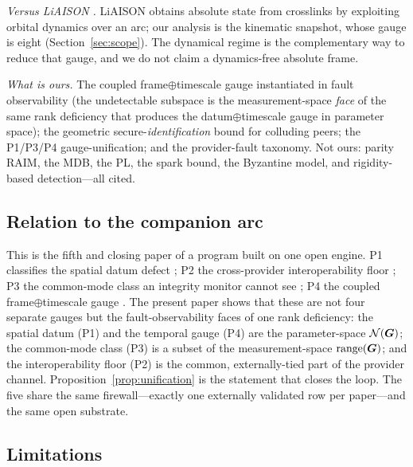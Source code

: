 \emph{Versus LiAISON \citep{hillborn2007}.} LiAISON obtains absolute state from crosslinks by
exploiting orbital dynamics over an arc; our analysis is the kinematic snapshot, whose gauge
is eight (Section~\ref{sec:scope}). The dynamical regime is the complementary way to reduce
that gauge, and we do not claim a dynamics-free absolute frame.

\emph{What is ours.} The coupled frame$\oplus$timescale gauge instantiated in fault
observability (the undetectable subspace is the measurement-space \emph{face} of the same rank
deficiency that produces the datum$\oplus$timescale gauge in parameter space); the geometric
secure-\emph{identification} bound for colluding peers;
the P1/P3/P4 gauge-unification; and the provider-fault taxonomy. Not ours: parity RAIM, the
MDB, the PL, the spark bound, the Byzantine model, and rigidity-based detection---all cited.

\subsection{Relation to the companion arc}
\label{sec:companions}

This is the fifth and closing paper of a program built on one open engine. P1 classifies the
spatial datum defect \citep{baweja2026datum}; P2 the cross-provider interoperability floor
\citep{baweja2026interop}; P3 the common-mode class an integrity monitor cannot see
\citep{baweja2026commonmode}; P4 the coupled frame$\oplus$timescale gauge
\citep{baweja2026gauge}. The present paper shows that these are not four separate gauges but
the fault-observability faces of one rank deficiency: the spatial datum (P1) and the temporal
gauge (P4) are the parameter-space $\mathcal{N}(\bm{G})$; the common-mode class (P3) is a subset of
the measurement-space $\operatorname{range}(\bm{G})$; and the interoperability floor (P2) is the common,
externally-tied part of the provider channel. Proposition~\ref{prop:unification} is the
statement that closes the loop. The five share the same firewall---exactly one externally
validated row per paper---and the same open substrate.

\subsection{Limitations}
\label{sec:limitations}

